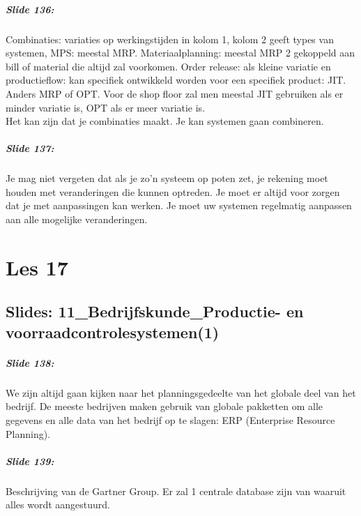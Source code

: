 \documentclass[10pt,a4paper]{report}
\begin{document}
\paragraph{Slide 136:} Combinaties: variaties op werkingstijden in kolom 1, kolom 2 geeft types van systemen, MPS: meestal MRP. Materiaalplanning: meestal MRP 2 gekoppeld aan bill of material die altijd zal voorkomen. Order release: als kleine variatie en productieflow: kan specifiek ontwikkeld worden voor een specifiek product: JIT. Anders MRP of OPT. Voor de shop floor zal men meestal JIT gebruiken als er minder variatie is, OPT als er meer variatie is.\\
Het kan zijn dat je combinaties maakt. Je kan systemen gaan combineren.

\paragraph{Slide 137:} Je mag niet vergeten dat als je zo'n systeem op poten zet, je rekening moet houden met veranderingen die kunnen optreden. Je moet er altijd voor zorgen dat je met aanpassingen kan werken. Je moet uw systemen regelmatig aanpassen aan alle mogelijke veranderingen. 

\chapter{Les 17}
\section{Slides: 11\_Bedrijfskunde\_Productie- en voorraadcontrolesystemen(1)}

\paragraph{Slide 138:} We zijn altijd gaan kijken naar het planningsgedeelte van het globale deel van het bedrijf. De meeste bedrijven maken gebruik van globale pakketten om alle gegevens en alle data van het bedrijf op te slagen: ERP (Enterprise Resource Planning).

\paragraph{Slide 139:} Beschrijving van de Gartner Group. Er zal 1 centrale database zijn van waaruit alles wordt aangestuurd.
\end{document}
